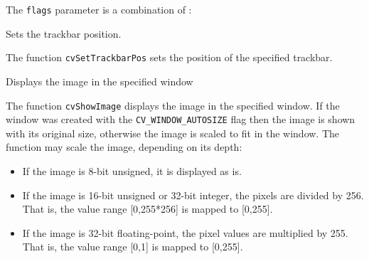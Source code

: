 The \texttt{flags} parameter is a combination of :

\begin{description}
\end{description}

Sets the trackbar position.


\begin{description}
\end{description}

The function \texttt{cvSetTrackbarPos} sets the position of the specified trackbar.

Displays the image in the specified window


\begin{description}
\end{description}

The function \texttt{cvShowImage} displays the image in the specified window. If the window was created with the \texttt{CV\_WINDOW\_AUTOSIZE} flag then the image is shown with its original size, otherwise the image is scaled to fit in the window. The function may scale the image, depending on its depth:
\begin{itemize}
    \item If the image is 8-bit unsigned, it is displayed as is.
    \item If the image is 16-bit unsigned or 32-bit integer, the pixels are divided by 256. That is, the value range [0,255*256] is mapped to [0,255].
    \item If the image is 32-bit floating-point, the pixel values are multiplied by 255. That is, the value range [0,1] is mapped to [0,255].
\end{itemize}

